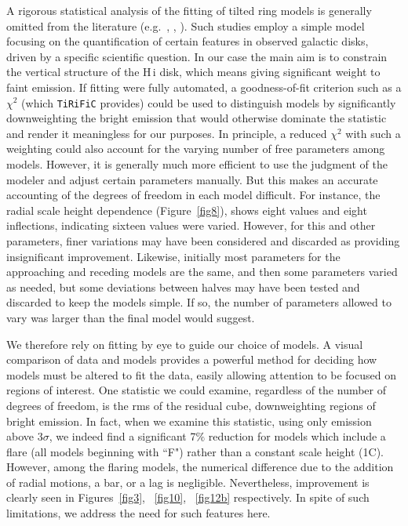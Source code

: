 \documentclass{emulateapj}
\begin{document}
\par
     A rigorous statistical analysis of the fitting of tilted ring models is generally omitted from the literature (e.g.\ \citealt{2005A&A...439..947B}, \citealt{2007AJ....134.1019O},
\citealt{2008ApJ...676..991R}).  Such studies employ a simple model focusing on the quantification of certain features in observed galactic disks, driven by a specific scientific question. In our case
the main aim is to constrain the vertical structure of the {\sc H\,i} disk, which means giving significant weight to faint emission.  If fitting were fully automated, a goodness-of-fit criterion such as a ${\chi}^{2}$ (which {\tt TiRiFiC} provides) could be used to distinguish models by significantly downweighting the bright emission that would otherwise dominate the statistic and render it meaningless for our purposes.  In principle, a reduced ${\chi}^{2}$ with such a weighting could also account for the varying number of free parameters among models.  However, it is generally much more efficient to use the judgment of the modeler and adjust certain parameters manually.  But this makes an accurate accounting of the degrees of freedom in each model difficult.  For instance, the radial scale height dependence (Figure~\ref{fig8}), shows eight values and eight inflections, indicating sixteen values were varied.  However, for this and other parameters, finer variations may have been considered and discarded as providing insignificant improvement.  Likewise, initially most parameters for the approaching and receding models are the same, and then some parameters varied as needed, but some deviations between halves may have been tested and discarded to keep the models simple.  If so, the number of parameters allowed to vary was larger than the final model would suggest.

\par
    We therefore rely on fitting by eye to guide our choice of models.  A visual comparison of data and models provides a powerful method for deciding how models must be altered to fit the data, easily allowing attention to be focused on regions of interest.  One statistic we could examine, regardless of the number of degrees of freedom, is the rms of the residual cube, downweighting regions of bright emission.  In fact, when we examine this statistic, using only emission above 3$\sigma$, we indeed find a significant 7$\%$ reduction for models which include a flare (all models beginning with ``F") rather than a constant scale height (1C).  However, among the flaring models, the numerical difference due to the addition of radial motions, a bar, or a lag is negligible.  Nevertheless, improvement is clearly seen in Figures~\ref{fig3}, ~\ref{fig10}, ~\ref{fig12b} respectively.  In spite of such limitations, we address the need for such features here.
\end{document}
